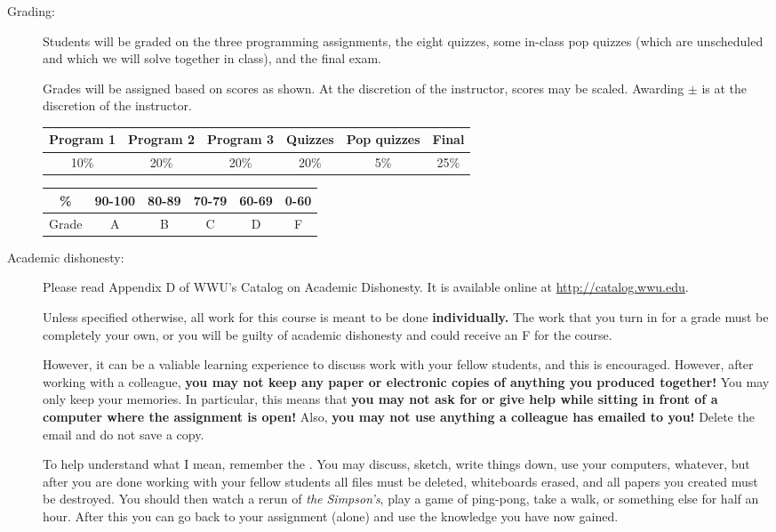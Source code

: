\documentclass{article}
\begin{document}
\begin{description}
\item[Grading:] Students will be graded on the three programming
  assignments, the eight quizzes, some in-class pop quizzes (which are
  unscheduled and which we will solve together in class), and the
  final exam.

Grades will be assigned based on scores as shown.  At the discretion
of the instructor, scores may be scaled.  Awarding $\pm$ is at the
discretion of the instructor.

\begin{tabular}{|c|c|c|c|c|c|}\hline
Program 1 & Program 2 & Program 3 & Quizzes & Pop quizzes & Final \\\hline
10\% & 20\% & 20\% & 20\% & 5\% & 25\% \\\hline
\end{tabular}

\begin{tabular}{|c|c|c|c|c|c|}\hline
\% & 90-100 & 80-89 & 70-79 & 60-69 & 0-60\\\hline
Grade & A & B & C & D & F\\\hline
\end{tabular}


\item[Academic dishonesty:] Please read Appendix D of WWU's Catalog on
  Academic Dishonesty.  It is available online at
  \url{http://catalog.wwu.edu}.

  Unless specified otherwise, all work for this course is meant to
  be done {\bf individually.}  The work that you turn in for a grade
  must be completely your own, or you will be guilty of academic
  dishonesty and could receive an F for the course.

  However, it can be a valiable learning experience to discuss
  work with your fellow students, and this is encouraged.
  However, after working with a colleague, {\bf you may not keep any
    paper or electronic copies of anything you produced together!}
  You may only keep your memories.  In particular, this means that
  {\bf you may not ask for or give help while sitting in front of a
    computer where the assignment is open!}  Also, {\bf you may not
    use anything a colleague has emailed to you!}  Delete the email
  and do not save a copy.

  To help understand what I mean, remember the {}.  You may discuss, sketch, write things down, use
  your computers, whatever, but after you are done working with your
  fellow students all files must be deleted, whiteboards erased, and
  all papers you created must be destroyed.  You should then watch a
  rerun of {\em the Simpson's}, play a game of ping-pong, take a walk,
  or something else for half an hour. After this you can go back to
  your assignment (alone) and use the knowledge you have now gained.


\end{description}
\end{document}
